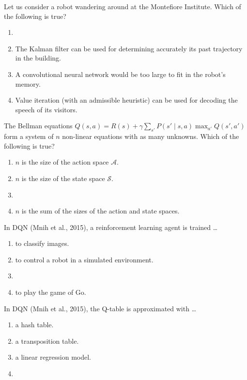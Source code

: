 \documentclass[11pt, a4paper]{exam}
\begin{document}
\begin{quiz}
    \item Let us consider a robot wandering around at the Montefiore Institute. Which of the following is true?
    \begin{enumerate}[label=$\bigcirc$]
        \item {}
        \item The Kalman filter can be used for determining accurately its past trajectory in the building.
        \item A convolutional neural network would be too large to fit in the robot's memory.
        \item Value iteration (with an admissible heuristic) can be used for decoding the speech of its visitors.
    \end{enumerate}

    \item The Bellman equations $Q(s,a) = R(s) + \gamma \sum_{s'} P(s' \mid s,a) \max_{a'} Q(s',a')$ form a system of $n$ non-linear equations with as many unknowns. Which of the following is true?
    \begin{enumerate}[label=$\bigcirc$]
        \item $n$ is the size of the action space $\mathcal{A}$.
        \item $n$ is the size of the state space $\mathcal{S}$.
        \item {}
        \item $n$ is the sum of the sizes of the action and state spaces.
    \end{enumerate}

    \item In DQN (Mnih et al., 2015), a reinforcement learning agent is trained \ldots
    \begin{enumerate}[label=$\bigcirc$]
        \item to classify images.
        \item to control a robot in a simulated environment.
        \item {}
        \item to play the game of Go.
    \end{enumerate}

    \item In DQN (Mnih et al., 2015), the Q-table is approximated with \ldots
    \begin{enumerate}[label=$\bigcirc$]
        \item a hash table.
        \item a transposition table.
        \item a linear regression model.
        \item {}
    \end{enumerate}
\end{quiz}
\end{document}

